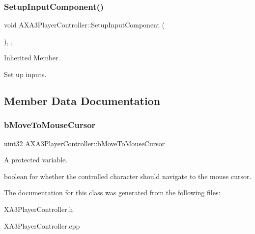 \subsubsection{\texorpdfstring{Setup\+Input\+Component()}{SetupInputComponent()}}
{\footnotesize\ttfamily void A\+X\+A3\+Player\+Controller\+::\+Setup\+Input\+Component (\begin{DoxyParamCaption}{ }\end{DoxyParamCaption})\hspace{0.3cm}{\ttfamily [override]}, {\ttfamily [protected]}, {\ttfamily [virtual]}}



Inherited Member. 

Set up inputs. 

\subsection{Member Data Documentation}
\hypertarget{class_a_x_a3_player_controller_af4d6c8b0909b0bc00e5b1df2437353bb}{}\label{class_a_x_a3_player_controller_af4d6c8b0909b0bc00e5b1df2437353bb} 
\subsubsection{\texorpdfstring{b\+Move\+To\+Mouse\+Cursor}{bMoveToMouseCursor}}
{\footnotesize\ttfamily uint32 A\+X\+A3\+Player\+Controller\+::b\+Move\+To\+Mouse\+Cursor\hspace{0.3cm}{\ttfamily [protected]}}



A protected variable. 

boolean for whether the controlled character should navigate to the mouse cursor. 

The documentation for this class was generated from the following files\+:\begin{DoxyCompactItemize}
\item 
X\+A3\+Player\+Controller.\+h\item 
X\+A3\+Player\+Controller.\+cpp\end{DoxyCompactItemize}
